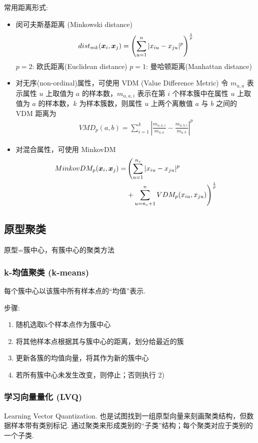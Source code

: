常用距离形式:
\begin{itemize}
    \item 闵可夫斯基距离 (Minkowski distance)
    \begin{align*}
        dist_{mk}(\bm{x}_i,\bm{x}_j)=\left( \sum_{u=1}^n|x_{iu}-x_{ju}|^p \right)^{\frac{1}{p}}
    \end{align*}
    \subitem $p = 2$: 欧氏距离(Euclidean distance)
    \subitem $p = 1$: 曼哈顿距离(Manhattan distance)
    \item 对无序(non-ordinal)属性，可使用 VDM (Value Difference Metric)
    \subitem 令 $m_{u,a}$ 表示属性 $u$ 上取值为 $a$ 的样本数，$m_{u,a,i}$ 表示在第 $i$ 个样本簇中在属性 $u$ 上取值为 $a$ 的样本数，$k$ 为样本簇数，则属性 $u$ 上两个离散值 $a$ 与 $b$ 之间的 VDM 距离为
    \begin{align*}
        VMD_p(a,b)=\sum_{i=1}^k\left| \frac{m_{u,a,i}}{m_{u,a}}-\frac{m_{u,b, i}}{m_{u,b}} \right|^p
    \end{align*}
    \item 对混合属性，可使用 MinkovDM
    \begin{align*}
        MinkovDM_p(\bm{x}_i,\bm{x}_j)=&\left( \sum_{u=1}^{n_c}|x_{iu}-x_{ju}|^p\right. \\
        &\left.+ \sum_{u=n_c+1}^n VDM_p(x_{iu}, x_{ju}) \right)^{\frac{1}{p}}
    \end{align*}
\end{itemize}


\subsection{原型聚类}
原型=簇中心，有簇中心的聚类方法

\subsubsection{k-均值聚类 (k-means)}
每个簇中心以该簇中所有样本点的“均值”表示. 

步骤:
\begin{enumerate}
    \item 随机选取k个样本点作为簇中心
    \item 将其他样本点根据其与簇中心的距离，划分给最近的簇
    \item 更新各簇的均值向量，将其作为新的簇中心
    \item 若所有簇中心未发生改变，则停止；否则执行 2)
\end{enumerate}

\subsubsection{学习向量量化 (LVQ)}
Learning Vector Quantization. 也是试图找到一组原型向量来刻画聚类结构，但数据样本带有类别标记. 通过聚类来形成类别的“子类”结构；每个聚类对应于类别的一个子类. 

